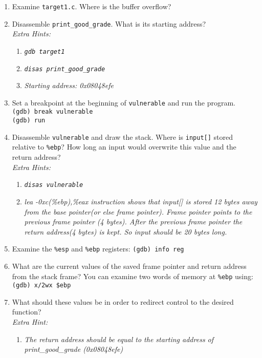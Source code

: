 \documentclass[letterpaper,12pt]{report}
\begin{document}
{\begin{enumerate}
\item Examine \texttt{target1.c}.  Where is the buffer overflow?
\item Disassemble \texttt{print\_good\_grade}.  What is its starting address? \\
\textit{Extra Hints:} 
\vspace{-11pt}
\begin{enumerate}
\item \textit{\texttt{gdb target1}}  
\item \textit {\texttt{disas print\_good\_grade}} 
\item \textit{Starting address: 0x08048efe}
\end{enumerate}
\item Set a breakpoint at the beginning of \texttt{vulnerable} and run the program.\\
\texttt{(gdb) break vulnerable}\\
\texttt{(gdb) run}
\item Disassemble \texttt{vulnerable} and draw the stack.  Where is
\texttt{input[]} stored relative to \texttt{\%ebp}?  How long an input would
overwrite this value and the return address? \\
\textit{Extra Hints:} 
\vspace{-11pt}
\begin{enumerate}
\item \textit{\texttt{disas vulnerable}}  
\item \textit {lea -0xc(\%ebp),\%eax instruction shows that input[] is stored 12 bytes
away from the base pointer(or else frame pointer). Frame pointer points to the
previous frame pointer (4 bytes). After the previous frame pointer the return
address(4 bytes) is kept. So input should be 20 bytes long. } 
\end {enumerate}
\item Examine the \texttt{\%esp} and \texttt{\%ebp} registers: \texttt{(gdb)
info reg} 
\item What are the current values of the saved frame pointer and return address from the stack frame?  You can examine two words of memory at \texttt{\%ebp} using:
\texttt{(gdb) x/2wx \$ebp}
\item What should these values be in order to redirect control to the desired
function? \\
\textit{Extra Hint:} 
\vspace{-11pt}
\begin{enumerate}
\item \textit{The return address should be equal to the starting address of
print\_good\_grade (0x08048efe)}
\end{enumerate}


\end{enumerate}}
\end{document}
